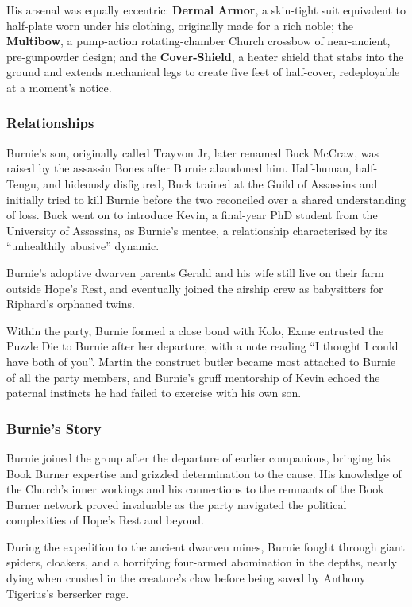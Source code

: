 His arsenal was equally eccentric: \textbf{Dermal Armor}, a skin-tight suit equivalent to half-plate worn under his clothing, originally made for a rich noble; the \textbf{Multibow}, a pump-action rotating-chamber Church crossbow of near-ancient, pre-gunpowder design; and the \textbf{Cover-Shield}, a heater shield that stabs into the ground and extends mechanical legs to create five feet of half-cover, redeployable at a moment's notice.

\subsubsection{Relationships}

Burnie's son, originally called Trayvon Jr, later renamed Buck McCraw, was raised by the assassin Bones after Burnie abandoned him.  Half-human, half-Tengu, and hideously disfigured, Buck trained at the Guild of Assassins and initially tried to kill Burnie before the two reconciled over a shared understanding of loss.  Buck went on to introduce Kevin, a final-year PhD student from the University of Assassins, as Burnie's mentee, a relationship characterised by its ``unhealthily abusive'' dynamic.

Burnie's adoptive dwarven parents Gerald and his wife still live on their farm outside Hope's Rest, and eventually joined the airship crew as babysitters for Riphard's orphaned twins.

Within the party, Burnie formed a close bond with Kolo, Exme entrusted the Puzzle Die to Burnie after her departure, with a note reading ``I thought I could have both of you''.  Martin the construct butler became most attached to Burnie of all the party members, and Burnie's gruff mentorship of Kevin echoed the paternal instincts he had failed to exercise with his own son.

\subsubsection{Burnie's Story}

Burnie joined the group after the departure of earlier companions, bringing his Book Burner expertise and grizzled determination to the cause.  His knowledge of the Church's inner workings and his connections to the remnants of the Book Burner network proved invaluable as the party navigated the political complexities of Hope's Rest and beyond.

During the expedition to the ancient dwarven mines, Burnie fought through giant spiders, cloakers, and a horrifying four-armed abomination in the depths, nearly dying when crushed in the creature's claw before being saved by Anthony Tigerius's berserker rage.

